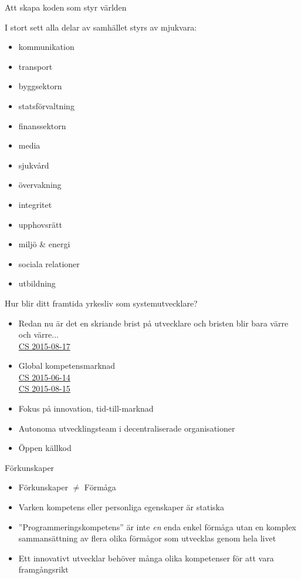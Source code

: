 \documentclass{lecturenotes}
\begin{document}
\begin{Slide}{Att skapa koden som styr världen}
\begin{multicols}{2}
I stort sett alla delar av samhället styrs av mjukvara:
{\scriptsize
\begin{itemize}
\item kommunikation
\item transport
\item byggsektorn
\item statsförvaltning
\item finanssektorn
\item media
\item sjukvård
\item övervakning
\item integritet
\item upphovsrätt
\item miljö \& energi
\item sociala relationer
\item utbildning 
\end{itemize}}
\columnbreak %
Hur blir ditt framtida yrkesliv som systemutvecklare?
{\Size{8pt}
\begin{itemize}
\item  Redan nu är det en skriande brist på utvecklare och bristen blir bara värre och värre... \\
  \href{http://computersweden.idg.se/2.2683/1.634770/rekrytera-utvecklare}{CS 2015-08-17}
\item Global kompetensmarknad \\ 
  \href{http://computersweden.idg.se/2.2683/1.630901/det-finns-programmerare-och-sa-finns-det-programmerare}{CS 2015-06-14}\\
   \href{http://computersweden.idg.se/2.2683/1.634700/7-satt-att-bli-en-battre-programmerare}{CS 2015-08-15}
\item Fokus på innovation, tid-till-marknad
\item Autonoma utvecklingsteam i decentraliserade organisationer
\item Öppen källkod
\end{itemize}}
\end{multicols}
\end{Slide}

\begin{Slide}{Förkunskaper}
\begin{itemize}
\item Förkunskaper $\neq$ Förmåga
\item Varken kompetens eller personliga egenskaper är statiska 
\item ''Programmeringskompetens'' är inte \textit{en} enda enkel förmåga utan en komplex sammansättning av flera olika förmågor som utvecklas genom hela livet
\item Ett innovativt utvecklar behöver många olika kompetenser för att vara framgångsrikt
\end{itemize}
\end{Slide}
\end{document}
